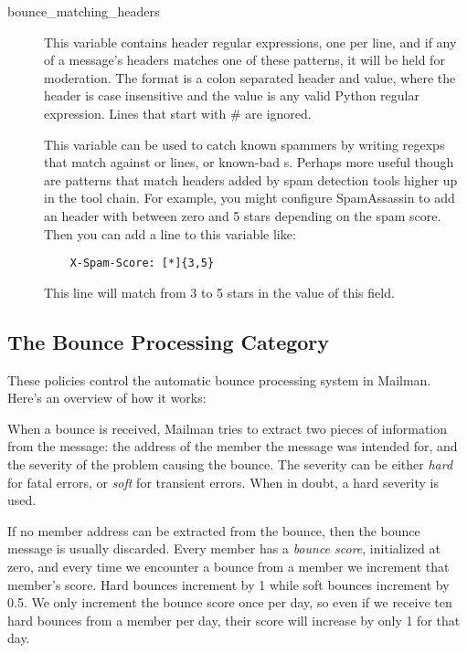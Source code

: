 \documentclass{howto}
\begin{document}
\begin{description}
\item[bounce_matching_headers]
    This variable contains header regular expressions, one per line,
    and if any of a message's headers matches one of these patterns,
    it will be held for moderation.  The format is a colon separated
    header and value, where the header is case insensitive and the
    value is any valid Python regular expression.  Lines that start
    with \# are ignored.

    This variable can be used to catch known spammers by writing
    regexps that match against  or 
    lines, or known-bad s.  Perhaps more useful
    though are patterns that match headers added by spam detection
    tools higher up in the tool chain.  For example, you might
    configure SpamAssassin to add an  header
    with between zero and 5 stars depending on the spam score.  Then
    you can add a line to this variable like:

    \begin{verbatim}
    X-Spam-Score: [*]{3,5}
    \end{verbatim}

    This line will match from 3 to 5 stars in the value of this
    field.
\end{description}

\subsection{The Bounce Processing Category}

These policies control the automatic bounce processing system in
Mailman.  Here's an overview of how it works:

When a bounce is received, Mailman tries to extract two pieces of
information from the message: the address of the member the message
was intended for, and the severity of the problem causing the bounce.
The severity can be either \emph{hard} for fatal errors, or
\emph{soft} for transient errors.  When in doubt, a hard severity is
used.

If no member address can be extracted from the bounce, then the bounce
message is usually discarded.  Every member has a \emph{bounce score},
initialized at zero, and every time we encounter a bounce from a
member we increment that member's score.  Hard bounces increment by 1
while soft bounces increment by 0.5.  We only increment the bounce
score once per day, so even if we receive ten hard bounces from a
member per day, their score will increase by only 1 for that day.
\end{document}
